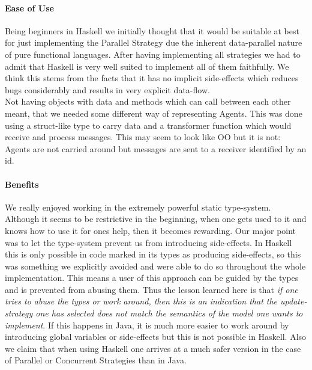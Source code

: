 \paragraph{Ease of Use}
Being beginners in Haskell we initially thought that it would be suitable at best for just implementing the Parallel Strategy due the inherent data-parallel nature of pure functional languages. After having implementing all strategies we had to admit that Haskell is very well suited to implement all of them faithfully. We think this stems from the facts that it has no implicit side-effects which reduces bugs considerably and results in very explicit data-flow. \\

Not having objects with data and methods which can call between each other meant, that we needed some different way of representing Agents. This was done using a struct-like type to carry data and a transformer function which would receive and process messages. This may seem to look like OO but it is not: Agents are not carried around but messages are sent to a receiver identified by an id.

\paragraph{Benefits}
We really enjoyed working in the extremely powerful static type-system. Although it seems to be restrictive in the beginning, when one gets used to it and knows how to use it for ones help, then it becomes rewarding. Our major point was to let the type-system prevent us from introducing side-effects. In Haskell this is only possible in code marked in its types as producing side-effects, so this was something we explicitly avoided and were able to do so throughout the whole implementation. This means a user of this approach can be guided by the types and is prevented from abusing them. Thus the lesson learned here is that \textit{if one tries to abuse the types or work around, then this is an indication that the update-strategy one has selected does not match the semantics of the model one wants to implement}. If this happens in Java, it is much more easier to work around by introducing global variables or side-effects but this is not possible in Haskell. Also we claim that when using Haskell one arrives at a much safer version in the case of Parallel or Concurrent Strategies than in Java.\\

